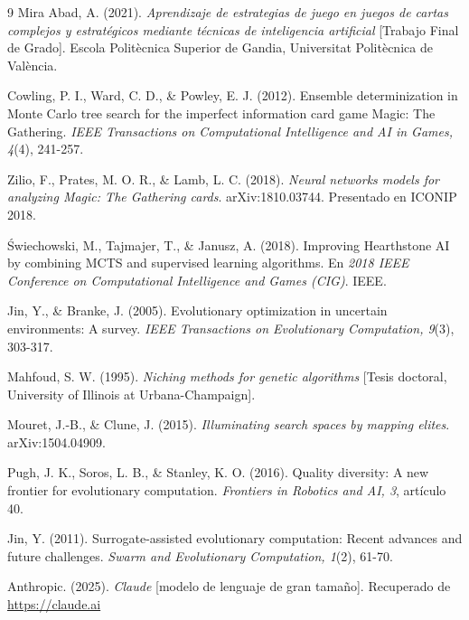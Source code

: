 \begin{thebibliography}{9}
Mira Abad, A. (2021). \textit{Aprendizaje de estrategias de juego en juegos de cartas complejos y estratégicos mediante técnicas de inteligencia artificial} [Trabajo Final de Grado]. Escola Politècnica Superior de Gandia, Universitat Politècnica de València.

Cowling, P. I., Ward, C. D., \& Powley, E. J. (2012). Ensemble determinization in Monte Carlo tree search for the imperfect information card game Magic: The Gathering. \textit{IEEE Transactions on Computational Intelligence and AI in Games, 4}(4), 241-257.

Zilio, F., Prates, M. O. R., \& Lamb, L. C. (2018). \textit{Neural networks models for analyzing Magic: The Gathering cards}. arXiv:1810.03744. Presentado en ICONIP 2018.

Świechowski, M., Tajmajer, T., \& Janusz, A. (2018). Improving Hearthstone AI by combining MCTS and supervised learning algorithms. En \textit{2018 IEEE Conference on Computational Intelligence and Games (CIG)}. IEEE.

Jin, Y., \& Branke, J. (2005). Evolutionary optimization in uncertain environments: A survey. \textit{IEEE Transactions on Evolutionary Computation, 9}(3), 303-317.

Mahfoud, S. W. (1995). \textit{Niching methods for genetic algorithms} [Tesis doctoral, University of Illinois at Urbana-Champaign].

Mouret, J.-B., \& Clune, J. (2015). \textit{Illuminating search spaces by mapping elites}. arXiv:1504.04909.

Pugh, J. K., Soros, L. B., \& Stanley, K. O. (2016). Quality diversity: A new frontier for evolutionary computation. \textit{Frontiers in Robotics and AI, 3}, artículo 40.

Jin, Y. (2011). Surrogate-assisted evolutionary computation: Recent advances and future challenges. \textit{Swarm and Evolutionary Computation, 1}(2), 61-70.

Anthropic. (2025). \textit{Claude} [modelo de lenguaje de gran tamaño]. Recuperado de \url{https://claude.ai}

\end{thebibliography}

